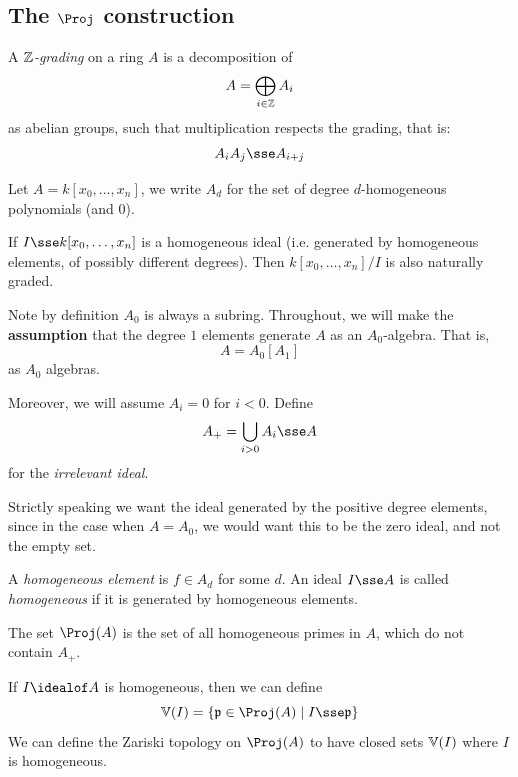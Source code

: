 \documentclass{article}
\begin{document}
\subsection{The \(\Proj\) construction}

\begin{definition}
    [\(\Z\)-grading]
    A \emph{\(\Z\)-grading} on a ring \(A\) is a decomposition of
    \[A = \bigoplus_{i \in \mathbb{Z}}A_i\]
    as abelian groups, such that multiplication respects the grading, that is:
    \[A_iA_j \sse A_{i+j}\]
\end{definition}

\begin{example}
    Let \(A = k[x_0, \dots, x_n]\), we write \(A_d\) for the set of degree \(d\)-homogeneous polynomials (and \(0\)).

    If \(I \sse k[x_0, \dots, x_n]\) is a homogeneous ideal (i.e. generated by homogeneous elements, of possibly different degrees). Then \(k[x_0, \dots, x_n]/I\) is also naturally graded.
\end{example}

Note by definition \(A_0\) is always a subring. Throughout, we will make the \textbf{assumption} that the degree \(1\) elements generate \(A\) as an \(A_0\)-algebra. That is,
\[A = A_0[A_1]\]
as \(A_0\) algebras.

\lec

Moreover, we will assume \(A_i = 0\) for \(i < 0\). Define
\[A_+ = \bigcup_{i > 0}A_i \sse A\]
for the \emph{irrelevant ideal}. \begin{addendum}
    Strictly speaking we want the ideal generated by the positive degree elements, since in the case when \(A = A_0\), we would want this to be the zero ideal, and not the empty set.
\end{addendum}

\begin{definition}
     A \emph{homogeneous element} is \(f \in A_d\) for some \(d\). An ideal \(I \sse A\) is called \emph{homogeneous} if it is generated by homogeneous elements.
\end{definition}

\begin{definition}
    [\(\Proj(A)\)]
    The set \(\Proj(A)\) is the set of all homogeneous primes in \(A\), which do not contain \(A_+\).

    If \(I \idealof A\) is homogeneous, then we can define
    \[\van(I) = \left\{\mfp \in \Proj(A) \mid I \sse \mfp\right\}\]
    We can define the Zariski topology on \(\Proj(A)\) to have closed sets \(\mathbb{V}(I)\) where \(I\) is homogeneous.
\end{definition}
\end{document}
